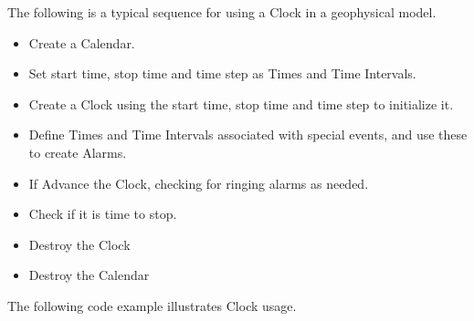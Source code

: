 
The following is a typical sequence for using a Clock in a 
geophysical model.

\begin{itemize}
\item Create a Calendar.
\item Set start time, stop time and time step as Times and 
Time Intervals.
\item Create a Clock using the start time, stop time and time
step to initialize it.
\item Define Times and Time Intervals associated with special
events, and use these to create Alarms.
\end{itemize}

\begin{itemize}
\item If Advance the Clock, checking for ringing alarms as needed.
\item Check if it is time to stop.
\end{itemize}

\begin{itemize}
\item Destroy the Clock 
\item Destroy the Calendar
\end{itemize}

The following code example illustrates Clock usage.





